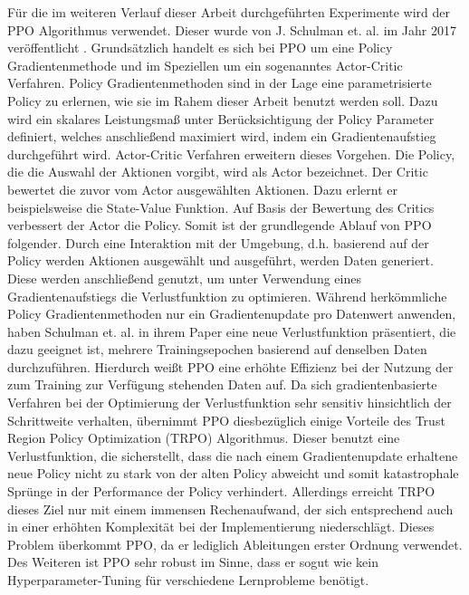 Für die im weiteren Verlauf dieser Arbeit durchgeführten Experimente wird der \ac{PPO} Algorithmus verwendet. Dieser wurde von J. Schulman et. al. im Jahr 2017 veröffentlicht \cite{PPO}. Grundsätzlich handelt es sich bei \ac{PPO} um eine Policy Gradientenmethode und im Speziellen um ein sogenanntes Actor-Critic Verfahren. Policy Gradientenmethoden sind in der Lage eine parametrisierte Policy zu erlernen, wie sie im Rahem dieser Arbeit benutzt werden soll. Dazu wird ein skalares Leistungsmaß unter Berücksichtigung der Policy Parameter definiert, welches anschließend maximiert wird, indem ein Gradientenaufstieg durchgeführt wird. Actor-Critic Verfahren erweitern dieses Vorgehen. Die Policy, die die Auswahl der Aktionen vorgibt, wird als Actor bezeichnet. Der Critic bewertet die zuvor vom Actor ausgewählten Aktionen. Dazu erlernt er beispielsweise die State-Value Funktion. Auf Basis der Bewertung des Critics verbessert der Actor die Policy. Somit ist der grundlegende Ablauf von \ac{PPO} folgender. Durch eine Interaktion mit der Umgebung, d.h. basierend auf der Policy werden Aktionen ausgewählt und ausgeführt, werden Daten generiert. Diese werden anschließend genutzt, um unter Verwendung eines Gradientenaufstiegs die Verlustfunktion zu optimieren. Während herkömmliche Policy Gradientenmethoden nur ein Gradientenupdate pro Datenwert anwenden, haben Schulman et. al. in ihrem Paper eine neue Verlustfunktion präsentiert, die dazu geeignet ist, mehrere Trainingsepochen basierend auf denselben Daten durchzuführen. Hierdurch weißt \ac{PPO} eine erhöhte Effizienz bei der Nutzung der zum Training zur Verfügung stehenden Daten auf. Da sich gradientenbasierte Verfahren bei der Optimierung der Verlustfunktion sehr sensitiv hinsichtlich der Schrittweite verhalten, übernimmt \ac{PPO} diesbezüglich einige Vorteile des Trust Region Policy Optimization (TRPO) Algorithmus. Dieser benutzt eine Verlustfunktion, die sicherstellt, dass die nach einem Gradientenupdate erhaltene neue Policy nicht zu stark von der alten Policy abweicht und somit katastrophale Sprünge in der Performance der Policy verhindert. Allerdings erreicht TRPO dieses Ziel nur mit einem immensen Rechenaufwand, der sich entsprechend auch in einer erhöhten Komplexität bei der Implementierung niederschlägt. Dieses Problem überkommt \ac{PPO}, da er lediglich Ableitungen erster Ordnung verwendet. Des Weiteren ist \ac{PPO} sehr robust im Sinne, dass er sogut wie kein Hyperparameter-Tuning für verschiedene Lernprobleme benötigt. \\

